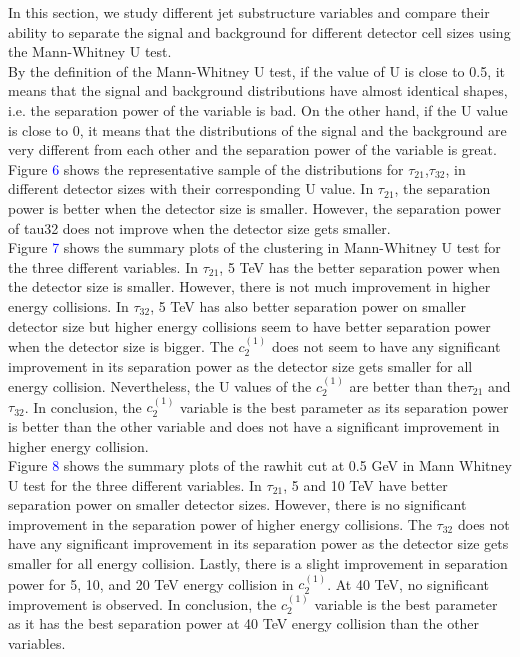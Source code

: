 \documentclass[final,1p,11pt]{elsarticle}
\begin{document}
In this section, we study different jet substructure variables and compare their ability to separate the signal and background for different detector cell sizes using the Mann-Whitney U test.\\

By the definition of the Mann-Whitney U test, if the value of U is close to 0.5, it means that the signal and background distributions have almost identical shapes, i.e. the separation power of the variable is bad. On the other hand, if the U value is close to 0, it means that the distributions of the signal and the background are very different from each other and the separation power of the variable is great.\\
 
Figure \textcolor{blue}{6} shows the representative sample of the distributions for $\tau_{21}$,$\tau_{32}$, in different detector sizes with their corresponding U value. In $\tau_{21}$, the separation power is better when the detector size is smaller. However, the separation power of tau32 does not improve when the detector size gets smaller.\\

Figure \textcolor{blue}{7} shows the summary plots of the clustering in Mann-Whitney U test for the three different variables.  In $\tau_{21}$, 5 TeV has the better separation power when the detector size is smaller. However, there is not much improvement in higher energy collisions. In $\tau_{32}$, 5 TeV has also better separation power on smaller detector size but higher energy collisions seem to have better separation power when the detector size is bigger. The $c_2^{(1)}$ does not seem to have any significant improvement in its separation power as the detector size gets smaller for all energy collision. Nevertheless, the U values of the $c_2^{(1)}$ are better than the$\tau_{21}$ and $\tau_{32}$. In conclusion, the $c_2^{(1)}$ variable is the best parameter as its separation power is better than the other variable and does not have a significant improvement in higher energy collision.\\

Figure \textcolor{blue}{8} shows the summary plots of the rawhit cut at 0.5 GeV in Mann Whitney U test for the three different variables. In $\tau_{21}$, 5 and 10 TeV have better separation power on smaller detector sizes. However, there is no significant improvement in the separation power of higher energy collisions. The $\tau_{32}$ does not have any significant improvement in its separation power as the detector size gets smaller for all energy collision. Lastly, there is a slight improvement in separation power for 5, 10, and 20 TeV energy collision in $c_2^{(1)}$. At 40 TeV, no significant improvement is observed. In conclusion, the $c_2^{(1)}$ variable is the best parameter as it has the best separation power at 40 TeV energy collision than the other variables.\\
\end{document}
